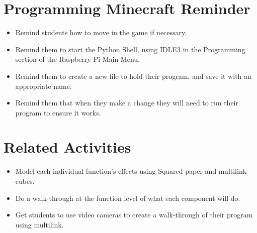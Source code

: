 \documentclass{geocraft-lesson-plan}
\begin{document}
\section*{Programming Minecraft Reminder}
\begin{itemize}
\item Remind students how to move in the game if necessary.
\item Remind them to start the Python Shell, using IDLE3 in the Programming section of the Raspberry Pi Main Menu.
\item Remind them to create a new file to hold their program, and save it with an appropriate name.  
\item Remind them that when they make a change they will need to run their program to ensure it works.
\end{itemize}

\section*{Related Activities}
\begin{itemize}
\item Model each individual function's effects using Squared paper and multilink cubes.
\item Do a walk-through at the function level of what each component will do.
\item Get students to use video cameras to create a walk-through of their program using multilink.
\end{itemize}
\end{document}
